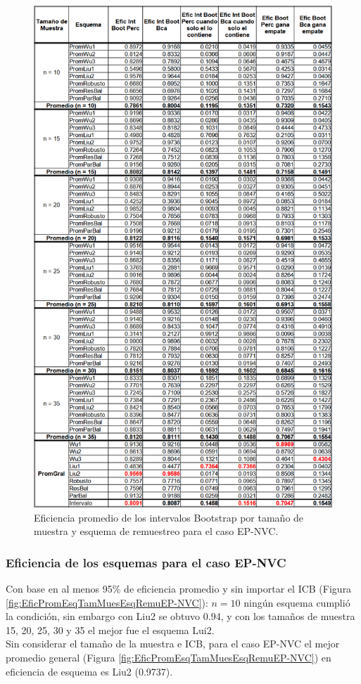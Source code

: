 \begin{figure}[H] 
	\centering 
	\includegraphics[width=0.55\linewidth]{img/EP_NVC_Efic_Boots.png} 
	\caption{Eficiencia promedio de los intervalos Bootstrap por tamaño de muestra y esquema de remuestreo para el caso EP-NVC.} 
	\label{fig:EficPromIntBootsTamMuestEsqRemuEP-NVC}
\end{figure}

\FloatBarrier

\subsubsection{Eficiencia de los esquemas para el caso EP-NVC}
Con base en al menos 95\% de eficiencia promedio y sin importar el ICB  (Figura \ref{fig:EficPromEsqTamMuesEsqRemuEP-NVC}): $n=10$ ningún esquema cumplió la condición, sin embargo con Liu2 se obtuvo 0.94, y con los tamaños de muestra 15, 20, 25, 30 y 35 el mejor fue el esquema Lui2.\\


Sin considerar el tamaño de la muestra e ICB, para el caso EP-NVC el mejor promedio general (Figura \ref{fig:EficPromEsqTamMuesEsqRemuEP-NVC}) en eficiencia de esquema es Liu2 (0.9737).


